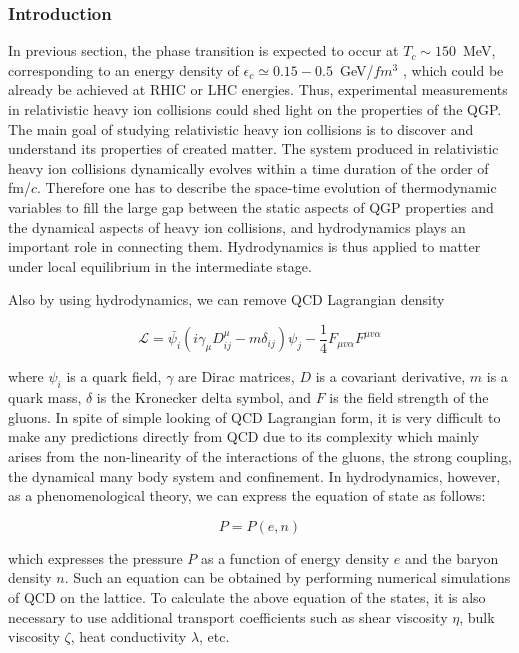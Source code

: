 \subsubsection{Introduction}
  In previous section, the phase transition is expected to occur at $T_c \sim 150$~MeV, corresponding to an energy density of $\epsilon_c \simeq 0.15 - 0.5$~GeV/$fm^3$ \cite{Bazavov:2014pvz}, which could be already be achieved at RHIC or LHC energies. Thus, experimental measurements in relativistic heavy ion collisions could shed light on the properties of the QGP. The main goal of studying relativistic heavy ion collisions is to discover and understand its properties of created matter. The system produced in relativistic heavy ion collisions dynamically evolves within a time duration of the order of fm/$c$. Therefore one has to describe the space-time evolution of thermodynamic variables to fill the large gap between the static aspects of QGP properties and the dynamical aspects of heavy ion collisions, and hydrodynamics plays an important role in connecting them. Hydrodynamics is thus applied to matter under local equilibrium in the intermediate stage.

Also by using hydrodynamics, we can remove QCD Lagrangian density

\begin{equation}
	\mathcal{L} = \bar{\psi_i}(i\gamma_\mu D^{\mu}_{ij} - m \delta_{ij})\psi_j - \frac{1}{4}F_{\mu v \alpha}F^{\mu v \alpha} 
\end{equation}
\smallskip

	where $\psi_i$ is a quark field, $\gamma$ are Dirac matrices, $D$ is a covariant derivative, $m$ is a quark mass, $\delta$ is the Kronecker delta symbol, and $F$ is the field strength of the gluons. In spite of simple looking of QCD Lagrangian form, it is very difficult to make any predictions directly from QCD due to its complexity which mainly arises from the non-linearity of the interactions of the gluons, the strong coupling, the dynamical many body system and confinement. In hydrodynamics, however, as a phenomenological theory, we can express the equation of state as follows: 
	
	\begin{equation}
		P = P(e, n)
	\end{equation}
	\smallskip 
	
	which expresses the pressure $P$ as a function of energy density $e$ and the baryon density $n$. Such an equation can be obtained by performing numerical simulations of QCD on the lattice. To calculate the above equation of the states, it is also necessary to use additional transport coefficients such as shear viscosity $\eta$, bulk viscosity $\zeta$, heat conductivity $\lambda$, etc. 
	
